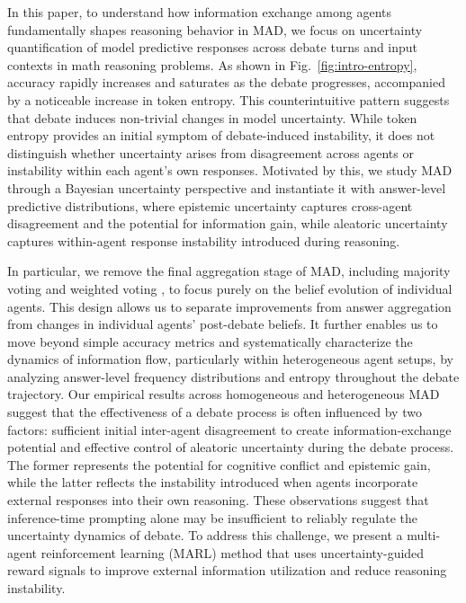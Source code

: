 \documentclass{article}
\theoremstyle{plain}
\theoremstyle{definition}
\theoremstyle{remark}
\begin{document}
In this paper, to understand how information exchange among agents fundamentally shapes reasoning behavior in MAD, we focus on uncertainty quantification \cite{lakshminarayanan2017simple} of model predictive responses across debate turns and input contexts in math reasoning problems. As shown in Fig.~\ref{fig:intro-entropy}, accuracy rapidly increases and saturates as the debate progresses, accompanied by a noticeable increase in token entropy. This counterintuitive pattern suggests that debate induces non-trivial changes in model uncertainty. While token entropy provides an initial symptom of debate-induced instability, it does not distinguish whether uncertainty arises from disagreement across agents or instability within each agent's own responses. Motivated by this, we study MAD through a Bayesian uncertainty perspective and instantiate it with answer-level predictive distributions, where epistemic uncertainty captures cross-agent disagreement and the potential for information gain, while aleatoric uncertainty captures within-agent response instability introduced during reasoning.

In particular, we remove the final aggregation stage of MAD, including majority voting \cite{du2023improving} and weighted voting \cite{chen2024reconcile}, to focus purely on the belief evolution of individual agents. This design allows us to separate improvements from answer aggregation from changes in individual agents' post-debate beliefs. It further enables us to move beyond simple accuracy metrics and systematically characterize the dynamics of information flow, particularly within heterogeneous agent setups, by analyzing answer-level frequency distributions and entropy throughout the debate trajectory. Our empirical results across homogeneous and heterogeneous MAD suggest that the effectiveness of a debate process is often influenced by two factors: sufficient initial inter-agent disagreement to create information-exchange potential and effective control of aleatoric uncertainty during the debate process. The former represents the potential for cognitive conflict and epistemic gain, while the latter reflects the instability introduced when agents incorporate external responses into their own reasoning. These observations suggest that inference-time prompting alone may be insufficient to reliably regulate the uncertainty dynamics of debate. To address this challenge, we present a multi-agent reinforcement learning (MARL) method that uses uncertainty-guided reward signals to improve external information utilization and reduce reasoning instability. 
\end{document}
